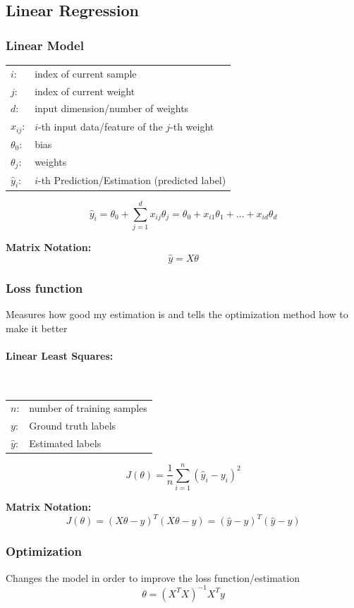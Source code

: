 \documentclass[10pt,a4paper]{article}
\begin{document}
\subsection{Linear Regression}
\subsubsection{Linear Model}
\begin{tabular}{ll}
	$i$: & index of current sample \\
	$j$: & index of current weight \\
	$d$: & input dimension/number of weights \\
	$x_{ij}$: & $i$-th input data/feature of the $j$-th weight \\
	$\theta_0$: & bias \\
	$\theta_j$: & weights \\
	$\hat y_i$: & $i$-th Prediction/Estimation (predicted label)
\end{tabular}

$$
	\hat y_i = \theta_0 + \sum_{j = 1}^d x_{ij} \theta_j = \theta_0 + x_{i1} \theta_1 + \dots + x_{id} \theta_d
$$

\textbf{Matrix Notation:}
$$
	\hat y = X \theta
$$

\subsubsection{Loss function}
Measures how good my estimation is and tells the optimization method how to make it better

\paragraph{Linear Least Squares:} ~\\
\begin{tabular}{ll}
	$n$: & number of training samples \\
	$y$: & Ground truth labels \\
	$\hat y$: & Estimated labels
\end{tabular}
$$
	J(\theta) = \frac 1 n \sum_{i = 1}^n (\hat y_i - y_i)^2
$$

\textbf{Matrix Notation:}
$$
	J(\theta) = (X \theta - y)^T (X \theta - y) = (\hat y - y)^T (\hat y - y)
$$

\subsubsection{Optimization}
Changes the model in order to improve the loss function/estimation
$$
	\theta = (X^TX)^{-1}X^Ty
$$
\end{document}
